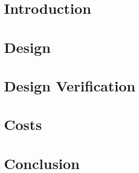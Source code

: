 \documentclass[12pt]{article}
\begin{document}

\clearpage
\section{Introduction}

\clearpage
\section{Design}

\clearpage
\section{Design Verification}

\clearpage
\section{Costs}

\clearpage
\section{Conclusion}

\clearpage
\printbibliography[heading=bibintoc, title={References}]

\begin{appendices}
    \clearpage
    

    \clearpage
    

    \clearpage
    

    \clearpage
    

\end{appendices}
\end{document}
